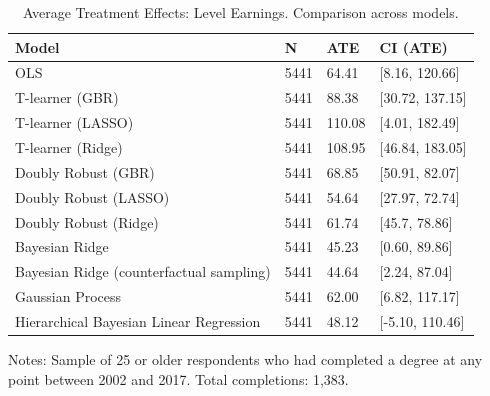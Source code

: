 \documentclass[12pt, a4paper]{article}
\begin{document}
\begin{landscape}
\clearpage
\begin{table}[htbp]
\centering
\small
\caption{Average Treatment Effects: Level Earnings. Comparison across models.}
\begin{tabular}{p{} C{0.1\textwidth} C{0.1\textwidth} C{0.2\textwidth}}
\toprule
Model  &  N  &  ATE  &  CI (ATE)  \\
\midrule 	   						
OLS	 & 	5441	 & 	64.41	 & 	[8.16, 120.66]	 \\
T-learner (GBR)	 & 	5441	 & 	88.38	 & 	[30.72, 137.15]	 \\
T-learner (LASSO)	 & 	5441	 & 	110.08	 & 	[4.01, 182.49]	 \\
T-learner (Ridge)	 & 	5441	 & 	108.95	 & 	[46.84, 183.05]	 \\
Doubly Robust (GBR)	 & 	5441	 & 	68.85	 & [50.91, 82.07] \\
Doubly Robust (LASSO)	 & 	5441	 & 	54.64	 & 	[27.97, 72.74]	 \\
Doubly Robust (Ridge)	 & 	5441	 & 	61.74	 & 	[45.7, 78.86]	 \\
Bayesian Ridge	 & 	5441	 & 	45.23	 & 	[0.60, 89.86]	 \\
Bayesian Ridge (counterfactual sampling)	 & 	5441	 & 	44.64	 & 	[2.24, 87.04]	 \\
Gaussian Process	 & 	5441	 & 	62.00	 & 	[6.82, 117.17]	 \\
Hierarchical Bayesian Linear Regression	 & 	5441	 & 	48.12 & [-5.10, 110.46]  \\
\bottomrule
\end{tabular}
\par\medskip
\parbox{1.0\textwidth}{\footnotesize Notes: Sample of 25 or older respondents who had completed a degree at any point between 2002 and 2017. Total completions: 1,383.}
\label{tab:atebslvl}
\end{table}










\end{landscape}
\end{document}
